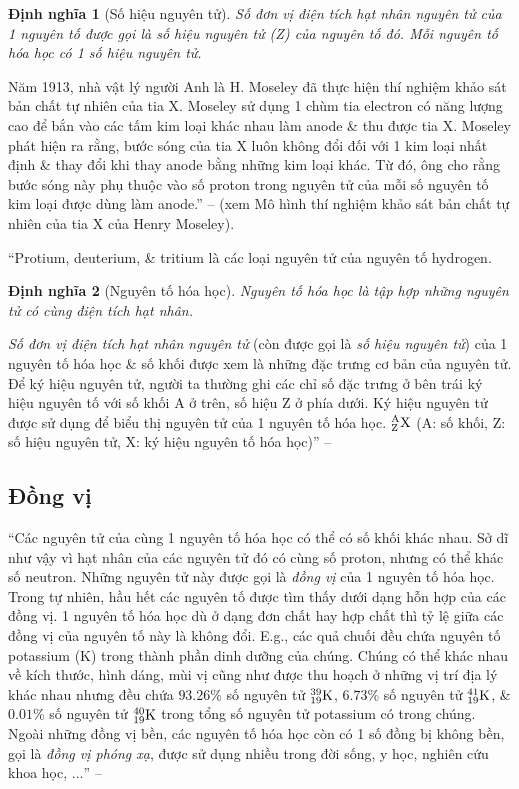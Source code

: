 \documentclass[oneside]{book}
\numberwithin{equation}{section}
\newtheorem{dinhnghia}{Định nghĩa}[section]
\begin{document}
\begin{dinhnghia}[Số hiệu nguyên tử]
	Số đơn vị điện tích hạt nhân nguyên tử của 1 nguyên tố được gọi là \emph{số hiệu nguyên tử (Z)} của nguyên tố đó. Mỗi nguyên tố hóa học có 1 số hiệu nguyên tử.
\end{dinhnghia}
Năm 1913, nhà vật lý người Anh là H. Moseley đã thực hiện thí nghiệm khảo sát bản chất tự nhiên của tia X. Moseley sử dụng 1 chùm tia electron có năng lượng cao để bắn vào các tấm kim loại khác nhau làm anode \& thu được tia X. Moseley phát hiện ra rằng, bước sóng của tia X luôn không đổi đối với 1 kim loại nhất định \& thay đổi khi thay anode bằng những kim loại khác. Từ đó, ông cho rằng bước sóng này phụ thuộc vào số proton trong nguyên tử của mỗi số nguyên tố kim loại được dùng làm anode.'' -- \cite[p. 21]{SGK_Hoa_Hoc_10_Chan_Troi_Sang_Tao} (xem \textsf{Mô hình thí nghiệm khảo sát bản chất tự nhiên của tia X của Henry Moseley}).

``Protium, deuterium, \& tritium là các loại nguyên tử của nguyên tố hydrogen.

\begin{dinhnghia}[Nguyên tố hóa học]
	\emph{Nguyên tố hóa học} là tập hợp những nguyên tử có cùng điện tích hạt nhân.
\end{dinhnghia}
\textit{Số đơn vị điện tích hạt nhân nguyên tử} (còn được gọi là \textit{số hiệu nguyên tử}) của 1 nguyên tố hóa học \& số khối được xem là những đặc trưng cơ bản của nguyên tử. Để ký hiệu nguyên tử, người ta thường ghi các chỉ số đặc trưng ở bên trái ký hiệu nguyên tố với số khối A ở trên, số hiệu Z ở phía dưới. Ký hiệu nguyên tử được sử dụng để biểu thị nguyên tử của 1 nguyên tố hóa học. $\rm{}_Z^AX$ (A: số khối, Z: số hiệu nguyên tử, X: ký hiệu nguyên tố hóa học)'' -- \cite[p. 22]{SGK_Hoa_Hoc_10_Chan_Troi_Sang_Tao}

\subsection{Đồng vị}
``Các nguyên tử của cùng 1 nguyên tố hóa học có thể có số khối khác nhau. Sở dĩ như vậy vì hạt nhân của các nguyên tử đó có cùng số proton, nhưng có thể khác số neutron. Những nguyên tử này được gọi là \textit{đồng vị} của 1 nguyên tố hóa học. Trong tự nhiên, hầu hết các nguyên tố được tìm thấy dưới dạng hỗn hợp của các đồng vị. 1 nguyên tố hóa học dù ở dạng đơn chất hay hợp chất thì tỷ lệ giữa các đồng vị của nguyên tố này là không đổi. E.g., các quả chuối đều chứa nguyên tố potassium (K) trong thành phần dinh dưỡng của chúng. Chúng có thể khác nhau về kích thước, hình dáng, mùi vị cũng như được thu hoạch ở những vị trí địa lý khác nhau nhưng đều chứa $93.26$\% số nguyên tử $\rm{}_{19}^{39}K$, $6.73$\% số nguyên tử $\rm{}_{19}^{41}K$, \& $0.01$\% số nguyên tử $\rm{}_{19}^{40}K$ trong tổng số nguyên tử potassium có trong chúng. Ngoài những đồng vị bền, các nguyên tố hóa học còn có 1 số đồng bị không bền, gọi là \textit{đồng vị phóng xạ}, được sử dụng nhiều trong đời sống, y học, nghiên cứu khoa học, $\ldots$'' -- \cite[pp. 22--23]{SGK_Hoa_Hoc_10_Chan_Troi_Sang_Tao}
\end{document}
